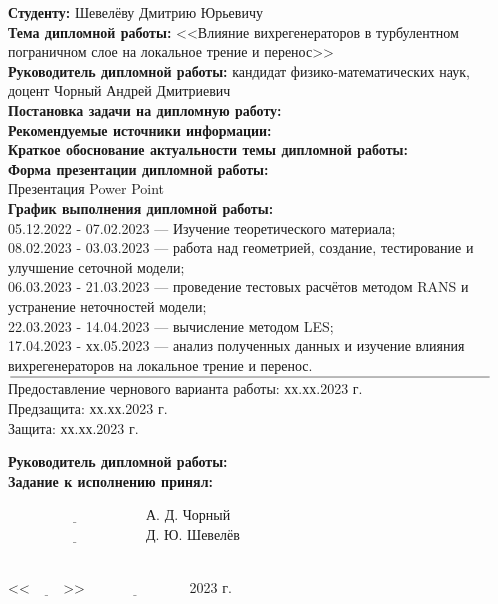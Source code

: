 \documentclass[a4paper]{extreport}
\begin{document}
	\begin{flushleft}
		\textbf{Студенту:} Шевелёву Дмитрию Юрьевичу\\
		\textbf{Тема дипломной работы:} <<Влияние вихрегенераторов в турбулентном пограничном слое на локальное трение и перенос>>\\
		\textbf{Руководитель дипломной работы:} кандидат физико-математических наук, доцент Чорный Андрей Дмитриевич\\
		\textbf{Постановка задачи на дипломную работу:}\\
		\textbf{Рекомендуемые источники информации:}\\
		\textbf{Краткое обоснование актуальности темы дипломной работы:}\\
		\textbf{Форма презентации дипломной работы:}\\
		Презентация Power Point\\
		\textbf{График выполнения дипломной работы:}\\
		05.12.2022 - 07.02.2023 --- Изучение теоретического материала;\\
		08.02.2023 - 03.03.2023 --- работа над геометрией, создание, тестирование и улучшение сеточной модели;\\
		06.03.2023 - 21.03.2023 --- проведение тестовых расчётов методом RANS и устранение неточностей модели;\\
		22.03.2023 - 14.04.2023 --- вычисление методом LES;\\
		17.04.2023 - хх.05.2023 --- анализ полученных данных и изучение влияния вихрегенераторов на локальное трение и перенос.\\
		$\underline{\hspace{\textwidth}}$
		Предоставление чернового варианта работы: хх.хх.2023 г.\\
		Предзащита: хх.хх.2023 г.\\
		Защита: хх.хх.2023 г.\\
	\end{flushleft}
	\begin{minipage}{0.5\textwidth}
		\textbf{Руководитель дипломной работы:}\\
		\textbf{Задание к исполнению принял:}\\
	\end{minipage}
	\hfill
	\begin{minipage}{0.5\textwidth}
		$\underline{\hspace{4cm}}$ А. Д. Чорный\\
		$\underline{\hspace{4cm}}$ Д. Ю. Шевелёв\\
	\end{minipage}
	\\
	<<$\underline{\hspace{1cm}}$>>$\underline{\hspace{3cm}}$ 2023 г.\\
\end{document}
